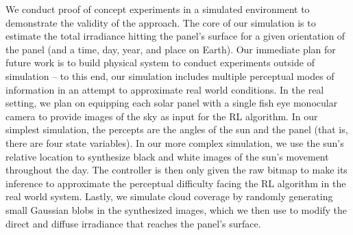 \documentclass[11pt]{article}
\begin{document}
We conduct proof of concept experiments in a simulated environment to demonstrate the validity of the approach. The core of our simulation is to estimate the total irradiance hitting the panel's surface for a given orientation of the panel (and a time, day, year, and place on Earth). Our immediate plan for future work is to build physical system to conduct experiments outside of simulation -- to this end, our simulation includes multiple perceptual modes of information in an attempt to approximate real world conditions. In the real setting, we plan on equipping each solar panel with a single fish eye monocular camera to provide images of the sky as input for the RL algorithm. In our simplest simulation, the percepts are the angles of the sun and the panel (that is, there are four state variables). In our more complex simulation, we use the sun's relative location to synthesize black and white images of the sun's movement throughout the day. The controller is then only given the raw bitmap to make its inference to approximate the perceptual difficulty facing the RL algorithm in the real world system. Lastly, we simulate cloud coverage by randomly generating small Gaussian blobs in the synthesized images, which we then use to modify the direct and diffuse irradiance that reaches the panel's surface.
\end{document}
